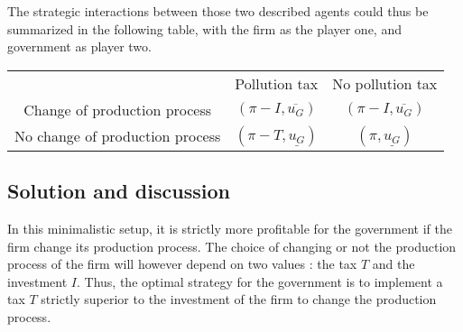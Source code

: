 \documentclass{article}
\begin{document}
The strategic interactions between those two described agents could thus be summarized in the following table, with the firm as the player one, and government as player two. 

\begin{center}
    \begin{tabular}{ |c|c|c| } 
     \hline
     & Pollution tax & No pollution tax \\ 
     Change of production process & $\left(\pi-I,\overline{u_{G}}\right)$ & $\left(\pi-I,\overline{u_{G}}\right)$  \\ 
     No change of production process & $\left(\pi-T,\underline{u_{G}}\right)$ & $\left(\pi,\underline{u_{G}}\right)$ \\ 
     \hline
    \end{tabular}
    \end{center}

\subsection{Solution and discussion}

In this minimalistic setup, it is strictly more profitable for the government if the firm change its production process. 
The choice of changing or not the production process of the firm will however depend on two values : the tax $T$ and the investment $I$.
Thus, the optimal strategy for the government is to implement a tax $T$ strictly superior to the investment of the firm to change the production process. 
\end{document}
